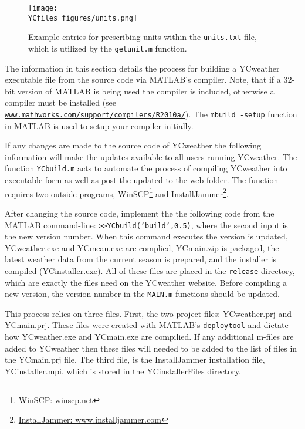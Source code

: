 \begin{figure}[!ht]\centering
	\texttt{[image: \\YCfiles figures/units.png]}
	\caption{Example entries for prescribing units within the \texttt{units.txt} file, which is utilized by the \texttt{getunit.m} function.}
	\label{fig:units}
\end{figure}

\label{sec:compile}
The information in this section details the process for building a YCweather executable file from the source code via MATLAB's compiler. Note, that if a 32-bit version of MATLAB is being used the compiler is included, otherwise a compiler must be installed (see \href{http://www.mathworks.com/support/compilers/R2010a/}{\nolinkurl{www.mathworks.com/support/compilers/R2010a/}}). The \texttt{mbuild -setup} function in MATLAB is used to setup your compiler initially.  

If any changes are made to the source code of YCweather the following information will make the updates available to all users running YCweather. The function \texttt{YCbuild.m} acts to automate the process of compiling YCweather into executable form as well as post the updated to the web folder.  The function requires two outside programs, WinSCP\footnote{\href{http://winscp.net}{WinSCP: winscp.net}} and InstallJammer\footnote{\href{http://www.installjammer.com/}{InstallJammer: www.installjammer.com}}.

After changing the source code, implement the the following code from the MATLAB command-line: \texttt{>>YCbuild('build',0.5)}, where the second input is the new version number.  When this command executes the version is updated, YCweather.exe and YCmean.exe are complied, YCmain.zip is packaged, the latest weather data from the current season is prepared, and the installer is compiled (YCinstaller.exe).  All of these files are placed in the \texttt{release} directory, which are exactly the files need on the YCweather website.  Before compiling a new version, the version number in the \texttt{MAIN.m} functions should be updated.

This process relies on three files.  First, the two project files: YCweather.prj and YCmain.prj.  These files were created with MATLAB's \texttt{deploytool} and dictate how YCweather.exe and YCmain.exe are compilied.  If any additional m-files are added to YCweather then these files will needed to be added to the list of files in the YCmain.prj file.  The third file, is the InstallJammer installation file, YCinstaller.mpi, which is stored in the YCinstallerFiles directory.

